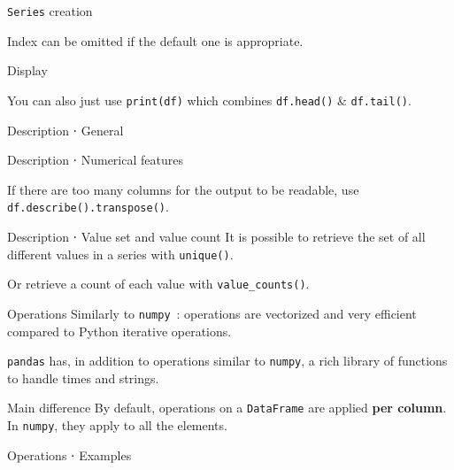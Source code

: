 \begin{frame}{\texttt{Series} creation}

  Index can be omitted if the default one is appropriate.
\end{frame}

\begin{frame}{Display}

  You can also just use \texttt{print(df)} which combines \texttt{df.head()} \& \texttt{df.tail()}.
\end{frame}

\begin{frame}{Description ⋅ General}
\end{frame}

\begin{frame}{Description ⋅ Numerical features}

  If there are too many columns for the output to be readable, use \texttt{df.describe().transpose()}.
\end{frame}

\begin{frame}{Description ⋅ Value set and value count}
  It is possible to retrieve the set of all different values in a series with \texttt{unique()}.
  
  Or retrieve a count of each value with \texttt{value\_counts()}.
\end{frame}

\begin{frame}{Operations}
  Similarly to \texttt{numpy}~: operations are vectorized and very efficient compared to Python iterative operations.

  \texttt{pandas} has, in addition to operations similar to \texttt{numpy}, a rich library of functions to handle times and strings.

  \begin{alertblock}{Main difference}
    By default, operations on a \texttt{DataFrame} are applied \textbf{per column}. In \texttt{numpy}, they apply to all the elements.
  \end{alertblock}
\end{frame}

\begin{frame}{Operations ⋅ Examples}
\end{frame}

